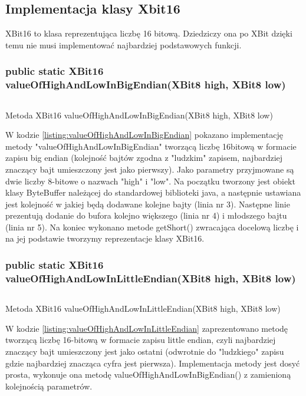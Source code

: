 \subsection{Implementacja klasy Xbit16}
XBit16 to klasa reprezentująca liczbę 16 bitową. Dziedziczy ona po XBit dzięki temu nie musi implementować najbardziej podstawowych funkcji. 


\subsubsection{public static XBit16 valueOfHighAndLowInBigEndian(XBit8 high, XBit8 low)}
\begin{listing}[h]
	\inputminted{java}{listings/xbit/valueOfHighAndLowInBigEndian.java}
	\caption{Metoda XBit16 valueOfHighAndLowInBigEndian(XBit8 high, XBit8 low)}
	\label{listing:valueOfHighAndLowInBigEndian}
\end{listing}
W kodzie \ref{listing:valueOfHighAndLowInBigEndian} pokazano implementację metody "valueOfHighAndLowInBigEndian" tworzącą liczbę 16bitową w formacie zapisu big endian (kolejność bajtów zgodna z "ludzkim" zapisem, najbardziej znaczący bajt umieszczony jest jako pierwszy).  Jako parametry przyjmowane są dwie liczby 8-bitowe o nazwach "high" i "low". 
Na początku tworzony jest obiekt klasy ByteBuffer należącej do standardowej biblioteki java, a następnie ustawiana jest kolejność w jakiej będą dodawane kolejne bajty (linia nr 3). Następne linie prezentują dodanie do bufora kolejno większego (linia nr 4) i młodszego  bajtu (linia nr 5). Na koniec wykonano metode getShort() zwracająca docelową liczbę i na jej podstawie tworzymy reprezentacje klasy XBit16.

\subsubsection{public static XBit16 valueOfHighAndLowInLittleEndian(XBit8 high, XBit8 low)}
\begin{listing}[h]
	\inputminted{java}{listings/xbit/valueOfHighAndLowInLittleEndian.java}
	\caption{Metoda XBit16 valueOfHighAndLowInLittleEndian(XBit8 high, XBit8 low)}
	\label{listing:valueOfHighAndLowInLittleEndian}
\end{listing}
W kodzie \ref{listing:valueOfHighAndLowInLittleEndian} zaprezentowano metodę tworzącą liczbę 16-bitową w formacie zapisu little endian, czyli najbardziej znaczący bajt umieszczony jest jako ostatni (odwrotnie do "ludzkiego" zapisu gdzie najbardziej znacząca cyfra jest pierwsza).
Implementacja metody jest dosyć prosta, wykonuje ona metodę valueOfHighAndLowInBigEndian() z zamienioną kolejnością parametrów.


